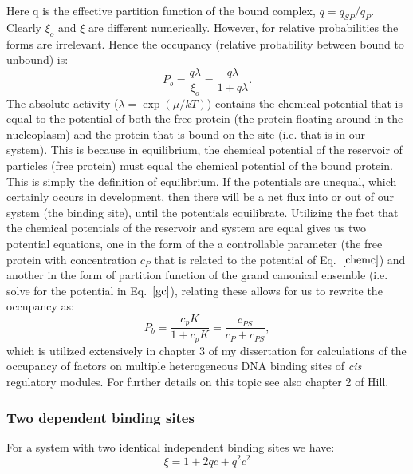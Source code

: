Here q is the effective partition function of the bound complex, $q= q_{SP}/q_P$.  Clearly $\xi_o$ and $\xi$ are different numerically.  However, for relative probabilities the forms are irrelevant.  Hence the occupancy (relative probability between bound to unbound) is:
\begin{equation}\label{gc}
P_b = \frac{q\lambda}{\xi_o}=\frac{q\lambda}{1+q\lambda}.
\end{equation}
The absolute activity ($\lambda=\exp( \mu /kT)$) contains the chemical potential that is equal to the potential of both the free protein (the protein floating around in the nucleoplasm) and the protein that is bound on the site (i.e. that is in our system).   This is because in equilibrium, the chemical potential of the reservoir of particles (free protein) must equal the chemical potential of the bound protein.  This is simply the definition of equilibrium.  If the potentials are unequal, which certainly occurs in development, then there will be a net flux into or out of our system (the binding site), until the potentials equilibrate.  Utilizing the fact that the chemical potentials of the reservoir and system are equal gives us two potential equations, one in the form of the a controllable parameter (the free protein with concentration $c_P$ that is related to the potential of Eq.~$\ref{chemc}$) and another in the form of partition function of the grand canonical ensemble (i.e. solve for the potential in Eq.~$\ref{gc}$), relating these allows for us to rewrite the occupancy as:
\begin{equation}
P_b = \frac{c_pK}{1+c_pK} = \frac{c_{PS}}{c_P + c_{PS}},
\end{equation}
which is utilized extensively in chapter 3 of my dissertation for calculations of the occupancy of factors on multiple heterogeneous DNA binding sites of \textit{cis} regulatory modules.  For further details on this topic see also chapter 2 of Hill\cite{hill}. 

\subsubsection{Two dependent binding sites}
 For a system with two identical independent binding sites we have:
\begin{equation}\label{}
  \xi = 1 + 2qc + q^2 c^2
\end{equation}

